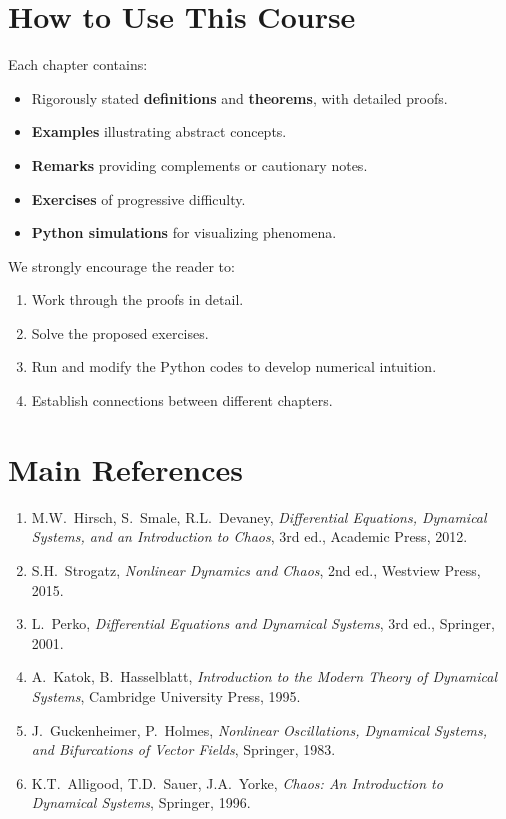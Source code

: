 \section*{How to Use This Course}

Each chapter contains:
\begin{itemize}
    \item Rigorously stated \textbf{definitions} and \textbf{theorems}, with
    detailed proofs.
    \item \textbf{Examples} illustrating abstract concepts.
    \item \textbf{Remarks} providing complements or cautionary notes.
    \item \textbf{Exercises} of progressive difficulty.
    \item \textbf{Python simulations} for visualizing phenomena.
\end{itemize}

We strongly encourage the reader to:
\begin{enumerate}
    \item Work through the proofs in detail.
    \item Solve the proposed exercises.
    \item Run and modify the Python codes to develop numerical intuition.
    \item Establish connections between different chapters.
\end{enumerate}

\section*{Main References}

\begin{enumerate}
    \item M.W.~Hirsch, S.~Smale, R.L.~Devaney, \emph{Differential Equations,
    Dynamical Systems, and an Introduction to Chaos}, 3rd ed., Academic Press,
    2012.
    \item S.H.~Strogatz, \emph{Nonlinear Dynamics and Chaos}, 2nd ed.,
    Westview Press, 2015.
    \item L.~Perko, \emph{Differential Equations and Dynamical Systems},
    3rd ed., Springer, 2001.
    \item A.~Katok, B.~Hasselblatt, \emph{Introduction to the Modern Theory
    of Dynamical Systems}, Cambridge University Press, 1995.
    \item J.~Guckenheimer, P.~Holmes, \emph{Nonlinear Oscillations, Dynamical
    Systems, and Bifurcations of Vector Fields}, Springer, 1983.
    \item K.T.~Alligood, T.D.~Sauer, J.A.~Yorke, \emph{Chaos: An Introduction
    to Dynamical Systems}, Springer, 1996.
\end{enumerate}

